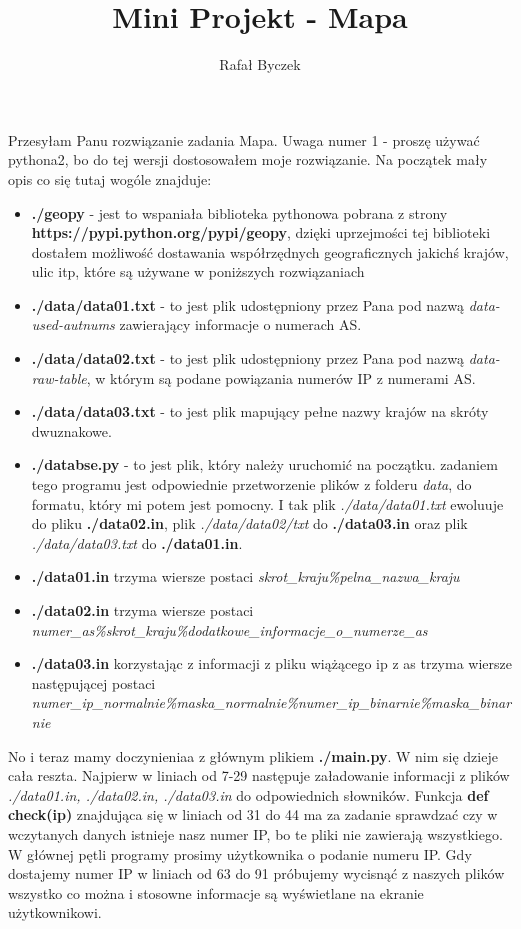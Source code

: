 \documentclass[11pt,a4paper]{article}
\author{Rafał Byczek}
\title{Mini Projekt - Mapa}
\begin{document}
\maketitle
Przesyłam Panu rozwiązanie zadania Mapa. Uwaga numer 1 - proszę używać pythona2, bo do tej wersji dostosowałem moje rozwiązanie. Na początek mały opis co się tutaj wogóle znajduje:

\begin{itemize}
\item \textbf{./geopy} - jest to wspaniała biblioteka pythonowa pobrana z strony \\ \textbf{https://pypi.python.org/pypi/geopy}, dzięki uprzejmości tej biblioteki dostałem możliwość dostawania współrzędnych geograficznych jakichś krajów, ulic itp, które są używane w poniższych rozwiązaniach

\item \textbf{./data/data01.txt} - to jest plik udostępniony przez Pana pod nazwą \textit{data-used-autnums} zawierający informacje o numerach AS.
\item \textbf{./data/data02.txt} - to jest plik udostępniony przez Pana pod nazwą \textit{data-raw-table}, w którym są podane powiązania numerów IP z numerami AS.
\item \textbf{./data/data03.txt} - to jest plik mapujący pełne nazwy krajów na skróty dwuznakowe.
\item \textbf{./databse.py} - to jest plik, który należy uruchomić na początku. zadaniem tego programu jest odpowiednie przetworzenie plików z folderu \textit{data}, do formatu, który mi potem jest pomocny. I tak plik \textit{./data/data01.txt} ewoluuje do pliku \textbf{./data02.in}, plik \textit{./data/data02/txt} do \textbf{./data03.in} oraz plik \textit{./data/data03.txt} do \textbf{./data01.in}.
\item \textbf{./data01.in} trzyma wiersze postaci \textit{skrot\_kraju\%pelna\_nazwa\_kraju}
\item \textbf{./data02.in} trzyma wiersze postaci 
\textit{numer\_as\%skrot\_kraju\%dodatkowe\_informacje\_o\_numerze\_as}
\item \textbf{./data03.in} korzystając z informacji z pliku wiążącego ip z as trzyma wiersze następującej postaci
\textit{numer\_ip\_normalnie\%maska\_normalnie\%numer\_ip\_binarnie\%maska\_binarnie}
\end{itemize}

No i teraz mamy doczynieniaa z głównym plikiem \textbf{./main.py}. W nim się dzieje cała reszta.
Najpierw w liniach od 7-29 następuje załadowanie informacji z plików \textit{./data01.in, ./data02.in, ./data03.in} do odpowiednich słowników. Funkcja \textbf{def check(ip)} znajdująca się w liniach od 31 do 44 ma za zadanie sprawdzać czy w wczytanych danych istnieje nasz numer IP, bo te pliki nie zawierają wszystkiego. W głównej pętli programy prosimy użytkownika o podanie numeru IP. Gdy dostajemy numer IP w liniach od 63 do 91 próbujemy wycisnąć z naszych plików wszystko co można i stosowne informacje są wyświetlane na ekranie użytkownikowi. 
\end{document}
